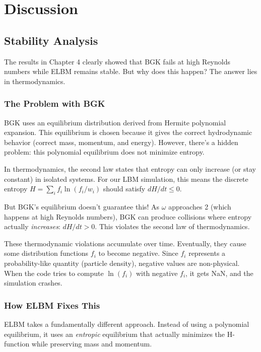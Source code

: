 \chapter{Discussion}

\section{Stability Analysis}

The results in Chapter 4 clearly showed that BGK fails at high Reynolds numbers while ELBM remains stable. But why does this happen? The answer lies in thermodynamics.

\subsection{The Problem with BGK}

BGK uses an equilibrium distribution derived from Hermite polynomial expansion. This equilibrium is chosen because it gives the correct hydrodynamic behavior (correct mass, momentum, and energy). However, there's a hidden problem: this polynomial equilibrium does not minimize entropy.

In thermodynamics, the second law states that entropy can only increase (or stay constant) in isolated systems. For our LBM simulation, this means the discrete entropy $H = \sum_i f_i \ln(f_i/w_i)$ should satisfy $dH/dt \leq 0$.

But BGK's equilibrium doesn't guarantee this! As $\omega$ approaches 2 (which happens at high Reynolds numbers), BGK can produce collisions where entropy actually \textit{increases}: $dH/dt > 0$. This violates the second law of thermodynamics.

These thermodynamic violations accumulate over time. Eventually, they cause some distribution functions $f_i$ to become negative. Since $f_i$ represents a probability-like quantity (particle density), negative values are non-physical. When the code tries to compute $\ln(f_i)$ with negative $f_i$, it gets NaN, and the simulation crashes.

\subsection{How ELBM Fixes This}

ELBM takes a fundamentally different approach. Instead of using a polynomial equilibrium, it uses an \textit{entropic} equilibrium that actually minimizes the H-function while preserving mass and momentum.

